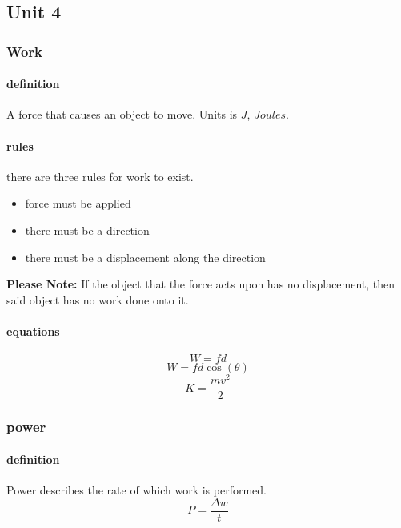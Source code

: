 \documentclass{article} %
\theoremstyle{theorem}
\theoremstyle{definition}
\begin{document}
    \subsection{Unit 4}
        \subsubsection{Work}
            \paragraph{definition}
                A force that causes an object to move. Units is $J$, $Joules$.
            \paragraph{rules}
                there are three rules for work to exist.
                \begin{itemize}
                    \item force must be applied
                    \item there must be a direction
                    \item there must be a displacement along the direction
                \end{itemize}
                \textbf{Please Note:} 
                If the object that the force acts upon has no displacement, then said object has no work done onto it.
            \paragraph{equations}
                \begin{equation} W=fd \end{equation}
                \begin{equation} W=fd\cos(\theta) \end{equation}
                \begin{equation} K=\frac{mv^2}{2} \end{equation}
        \subsubsection{power}
            \paragraph{definition}
                Power describes the rate of which work is performed.
                \begin{equation} P=\dfrac{\Delta w}{t} \end{equation}
\end{document}
